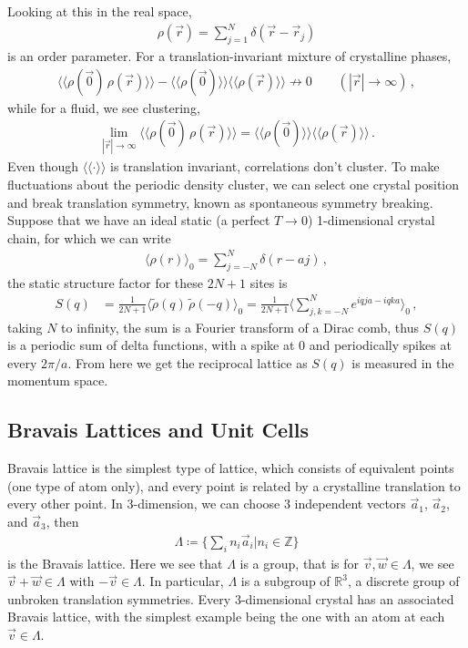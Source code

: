 \documentclass[11pt, oneside]{book}
\theoremstyle{break}
\theoremstyle{break}
\newcommand{\R}{\mathbb{R}}
\newcommand{\Z}{\mathbb{Z}}
\newcommand{\that}[1]{\widetilde{#1}}
\begin{document}
Looking at this in the real space, 
\begin{align*}
\rho(\vec{r}) = \sum_{j=1}^N \delta(\vec{r} - \vec{r}_j)
\end{align*}
is an order parameter. For a translation-invariant mixture of crystalline phases, 
\begin{align*}
\langle\langle \rho(\vec{0})\, \rho(\vec{r})\rangle\rangle - \langle \langle \rho(\vec{0})\rangle\rangle \langle \langle \rho(\vec{r})\rangle\rangle \not\longrightarrow 0\qquad (|\vec{r}|\to\infty)\,,
\end{align*}
while for a fluid, we see clustering, 
\begin{align*}
\lim_{|\vec{r}|\to \infty}\langle\langle \rho(\vec{0})\, \rho(\vec{r})\rangle\rangle = \langle \langle \rho(\vec{0})\rangle\rangle \langle \langle \rho(\vec{r})\rangle\rangle\,.
\end{align*}
Even though $\langle\langle \cdot \rangle\rangle$ is translation invariant, correlations don't cluster. To make fluctuations about the periodic density cluster, we can select one crystal position and break translation symmetry, known as  spontaneous symmetry breaking. \\

Suppose that we have an ideal static (a perfect $T\to 0$) 1-dimensional crystal chain, for which we can write
\begin{align*}
\langle \rho(r)\rangle_0 = \sum_{j=-N}^N \delta (r-aj)\,,
\end{align*}
the static structure factor for these $2N+1$ sites is 
\begin{align*}
S(q) &=\frac{1}{2N+1} \langle \that{\rho}(q) \, \that{\rho}(-q)\rangle_0= \frac{1}{2N+1}\langle \sum_{j,k= -N}^N e^{iqja - iqka}\rangle_0\,,
\end{align*}
taking $N$ to infinity, the sum is a Fourier transform of a Dirac comb, thus $S(q)$ is a periodic sum of delta functions, with a spike at $0$ and periodically spikes at every $2\pi/a$. From here we get the reciprocal lattice as $S(q)$ is measured in the momentum space. \\


\subsection{Bravais Lattices and Unit Cells}
Bravais lattice is the simplest type of lattice, which consists of equivalent points (one type of atom only), and every point is related by a crystalline translation to every other point. In $3$-dimension, we can choose $3$ independent vectors $\vec{a}_1$, $\vec{a}_2$, and $\vec{a}_3$, then 
\begin{align*}
\Lambda \coloneqq  \{ \sum_i n_i \vec{a}_i | n_i \in \Z\}
\end{align*}
is the Bravais lattice. Here we see that $\Lambda$ is a group, that is for $\vec{v},\vec{w} \in \Lambda$, we see $\vec{v}+ \vec{w} \in \Lambda$ with $-\vec{v} \in \Lambda$. In particular, $\Lambda$ is a subgroup of $\R^3$, a discrete group of unbroken translation symmetries. Every $3$-dimensional crystal has an associated Bravais lattice, with the simplest example being the one with an atom at each $\vec{v} \in \Lambda$. \\
\end{document}
